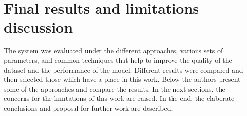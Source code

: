 \chapter{Final results and limitations discussion}\label{ch:final-results-and-summary-discussion}
The system was evaluated under the different approaches, various sets of parameters, and common techniques that help to improve the quality of the dataset and the performance of the model.
Different results were compared and then selected those which have a place in this work.
Below the authors present some of the approaches and compare the results.
In the next sections, the concerns for the limitations of this work are raised.
In the end, the elaborate conclusions and proposal for further work are described.
